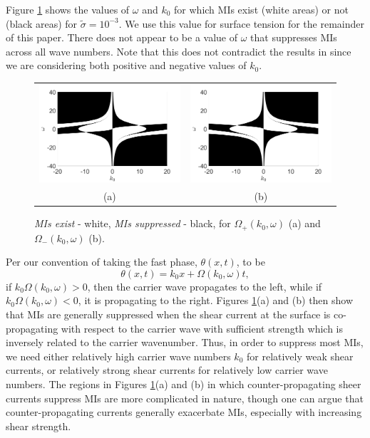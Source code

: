 \documentclass{JFM_Style/jfm}
\begin{document}
Figure \ref{fig:miplot} shows the values of $\omega$ and $k_{0}$ for which MIs exist (white areas) or not (black areas) for $\tilde{\sigma}=10^{-3}$.   We use this value for surface tension for the remainder of this paper.  There does not appear to be a value of $\omega$ that suppresses MIs across all wave numbers.  Note that this does not contradict the results in \cite{thomas2012nonlinear} since we are considering both positive and negative values of $k_{0}$.
\begin{figure}
\centering
\begin{tabular}{cc}
\includegraphics[width=.48\textwidth]{foc_defoc_pos_cut} & \includegraphics[width=.48\textwidth]{foc_defoc_neg_cut}\\
(a) & (b)\\
\end{tabular}
\caption{\small {\it MIs exist} - white, {\it MIs suppressed} - black, for $\Omega_{+}(k_{0},\omega)$ (a) and $\Omega_{-}(k_{0},\omega)$ (b).}
\label{fig:miplot}
\end{figure}

Per our convention of taking the fast phase, $\theta(x,t)$, to be
\[
\theta(x,t) = k_{0}x + \Omega(k_{0},\omega) t,
\]
if $k_{0}\Omega(k_{0},\omega)>0$, then the carrier wave propagates to the left, while if $k_0 \Omega(k_{0},\omega)<0$, it is propagating to the right.  Figures \ref{fig:miplot}(a) and (b) then show that MIs are generally suppressed when the shear current at the surface is co-propagating with respect to the carrier wave with sufficient strength which is inversely related to the carrier wavenumber.  Thus, in order to suppress most MIs, we need either relatively high carrier wave numbers $k_{0}$ for relatively weak shear currents, or relatively strong shear currents for relatively low carrier wave numbers.  The regions in Figures \ref{fig:miplot}(a) and (b) in which counter-propagating sheer currents suppress MIs are more complicated in nature, though one can argue that counter-propagating currents generally exacerbate MIs, especially with increasing shear strength.  
\end{document}
